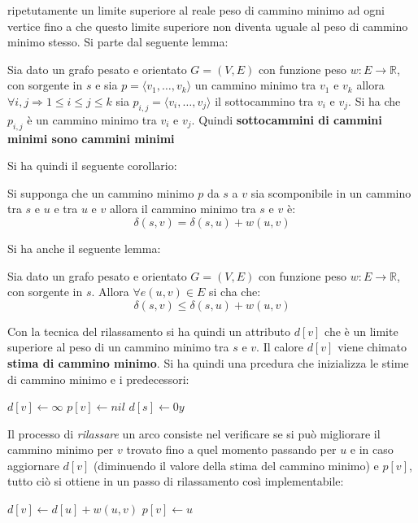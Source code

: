 \documentclass[a4paper,12pt, oneside]{book}
\begin{document}
ripetutamente un limite superiore al reale peso di cammino minimo ad
ogni vertice fino a che questo limite superiore non diventa uguale al
peso di cammino minimo stesso. Si parte dal seguente lemma:
\begin{lemma}
  Sia dato un grafo pesato e orientato $G=(V,E)$ con funzione peso
  $w:E\to \mathbb{R}$, con sorgente in $s$ e sia $p=\langle v_1,\ldots,v_k\rangle$  un
  cammino minimo tra $v_1$ e $v_k$ allora $\forall i,j\Longrightarrow
  1\leq i\leq j\leq k$ sia $p_{i,j}=\langle v_i,\ldots,v_j\rangle$ il
  sottocammino tra $v_i$ e $v_j$. Si ha che $p_{i,j}$ è un cammino
  minimo tra  $v_i$ e $v_j$. Quindi \textbf{sottocammini di cammini
    minimi sono cammini minimi}
\end{lemma}
Si ha quindi il seguente corollario:
\begin{corollario}
  Si supponga che un cammino minimo $p$ da $s$ a $v$ sia scomponibile
  in un cammino tra $s$ e $u$ e tra $u$ e $v$ allora il cammino minimo
  tra $s$ e $v$ è:
  \[\delta(s,v)=\delta(s,u)+w(u,v)\]
\end{corollario}
Si ha anche il seguente lemma:
\begin{lemma}
  Sia dato un grafo pesato e orientato $G=(V,E)$ con funzione peso
  $w:E\to \mathbb{R}$, con sorgente in $s$. Allora $\forall e(u,v)\in
  E$ si cha che:
  \[\delta(s,v)\leq \delta(s,u)+w(u,v)\]
\end{lemma}
Con la tecnica del rilassamento si ha quindi un attributo $d[v]$ che è
un limite superiore al peso di un cammino minimo tra $s$ e $v$. Il
calore $d[v]$ viene chimato \textbf{stima di cammino minimo}. Si ha
quindi una prcedura che inizializza le stime di cammino minimo e i
predecessori:
\begin{algorithm}[H]
  \begin{algorithmic}
    \State $d[v]\gets \infty$
    \State $p[v]\gets nil$
    \EndFor
    \State $d[s]\gets 0y$
    \EndFunction
  \end{algorithmic}
\end{algorithm}
Il processo di \textit{rilassare} un arco consiste nel verificare se
si può migliorare il cammino minimo per $v$ trovato fino a quel
momento passando per $u$ e in caso aggiornare $d[v]$ (diminuendo il
valore della stima del cammino minimo) e $p[v]$, tutto ciò si ottiene
in un passo di rilassamento così implementabile:
\begin{algorithm}[H]
  \begin{algorithmic}
    \State $d[v]\gets d[u]+w(u,v)$
    \State $p[v]\gets u$
    \EndIf
  \end{algorithmic}
\end{algorithm}
\end{document}
